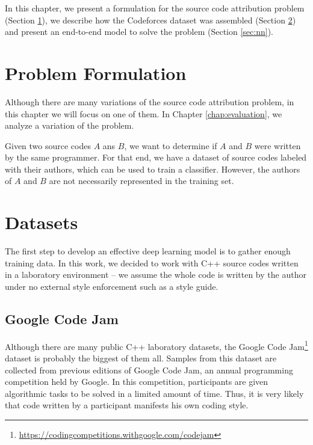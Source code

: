 \label{chap:methodology}

In this chapter, we present a formulation for the source code attribution problem (Section \ref{sec:formulation}), we describe how the Codeforces dataset was assembled (Section \ref{sec:dataset}) and present an end-to-end model to solve the problem (Section \ref{sec:nn}).

\section{Problem Formulation}\label{sec:formulation}

Although there are many variations of the source code attribution problem, in this chapter we will focus on one of them. In Chapter \ref{chap:evaluation}, we analyze a variation of the problem.

Given two source codes $A$ ans $B$, we want to determine if $A$ and $B$ were written by the same programmer. For that end, we have a dataset of source codes labeled with their authors, which can be used to train a classifier. However, the authors of $A$ and $B$ are not necessarily represented in the training set.

\section{Datasets}\label{sec:dataset}

The first step to develop an effective deep learning model is to gather enough training data. In this work, we decided to work with C++ source codes written in a laboratory environment -- we assume the whole code is written by the author under no external style enforcement such as a style guide.

\subsection{Google Code Jam}

Although there are many public C++ laboratory datasets, the Google Code Jam\footnote{\url{https://codingcompetitions.withgoogle.com/codejam}} dataset \cite{caliskan_2015} is probably the biggest of them all. Samples from this dataset are collected from previous editions of Google Code Jam, an annual programming competition held by Google. In this competition, participants are given algorithmic tasks to be solved in a limited amount of time. Thus, it is very likely that code written by a participant manifests his own coding style.

